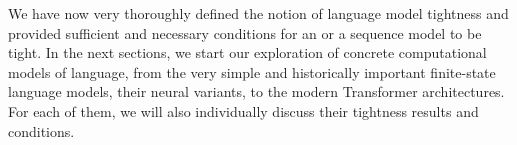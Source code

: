 
We have now very thoroughly defined the notion of language model tightness and provided sufficient and necessary conditions for an \autoregmodel or a sequence model to be tight.
In the next sections, we start our exploration of concrete computational models of language, from the very simple and historically important finite-state language models, their neural variants, to the modern Transformer architectures.
For each of them, we will also individually discuss their tightness results and conditions.